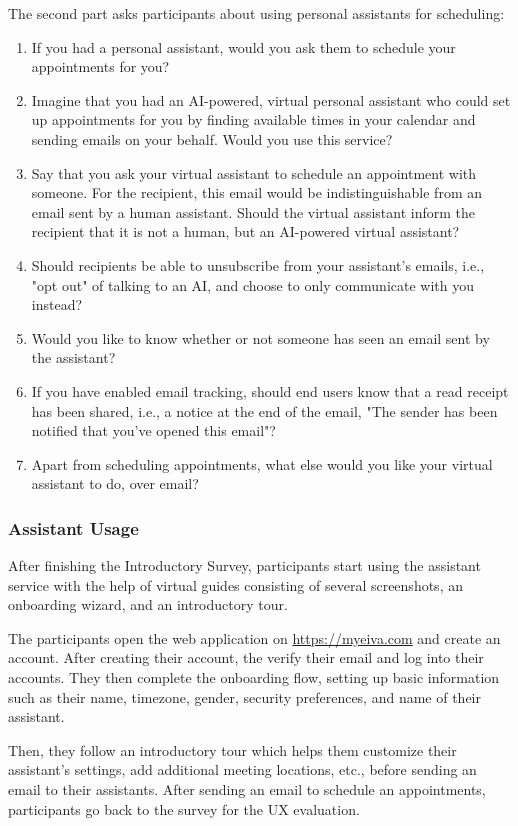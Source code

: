 \documentclass{article}
\begin{document}
The second part asks participants about using personal assistants for scheduling:

\begin{enumerate}[resume]
	\item If you had a personal assistant, would you ask them to schedule your appointments for you?
	\item Imagine that you had an AI-powered, virtual personal assistant who could set up appointments for you by finding available times in your calendar and sending emails on your behalf. Would you use this service?
	\item Say that you ask your virtual assistant to schedule an appointment with someone. For the recipient, this email would be indistinguishable from an email sent by a human assistant. Should the virtual assistant inform the recipient that it is not a human, but an AI-powered virtual assistant?
	\item Should recipients be able to unsubscribe from your assistant's emails, i.e., "opt out" of talking to an AI, and choose to only communicate with you instead?
	\item Would you like to know whether or not someone has seen an email sent by the assistant?
	\item If you have enabled email tracking, should end users know that a read receipt has been shared, i.e., a notice at the end of the email, "The sender has been notified that you've opened this email"?
	\item Apart from scheduling appointments, what else would you like your virtual assistant to do, over email?
\end{enumerate}

\subsubsection{Assistant Usage}

After finishing the Introductory Survey, participants start using the assistant service with the help of virtual guides consisting of several screenshots, an onboarding wizard, and an introductory tour.

The participants open the web application on \url{https://myeiva.com} and create an account. After creating their account, the verify their email and log into their accounts. They then complete the onboarding flow, setting up basic information such as their name, timezone, gender, security preferences, and name of their assistant.

Then, they follow an introductory tour which helps them customize their assistant's settings, add additional meeting locations, etc., before sending an email to their assistants. After sending an email to schedule an appointments, participants go back to the survey for the UX evaluation.
\end{document}
